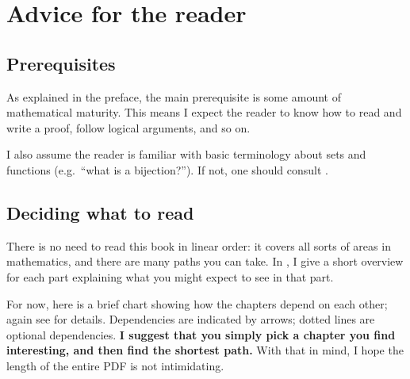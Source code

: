 \chapter{Advice for the reader}

\section{Prerequisites}
As explained in the preface,
the main prerequisite is some amount of mathematical maturity.
This means I expect the reader to know how
to read and write a proof, follow logical arguments, and so on.

I also assume the reader is familiar with basic terminology
about sets and functions (e.g.\ ``what is a bijection?'').
If not, one should consult .

\section{Deciding what to read}
There is no need to read this book in linear order:
it covers all sorts of areas in mathematics,
and there are many paths you can take.
In , I give a short overview for each part
explaining what you might expect to see in that part.

For now, here is a brief chart showing
how the chapters depend on each other;
again see  for details.
Dependencies are indicated by arrows;
dotted lines are optional dependencies.
\textbf{I suggest that you simply pick a chapter you find interesting,
and then find the shortest path.}
With that in mind, I hope the length of the entire PDF is not intimidating.


\newpage

